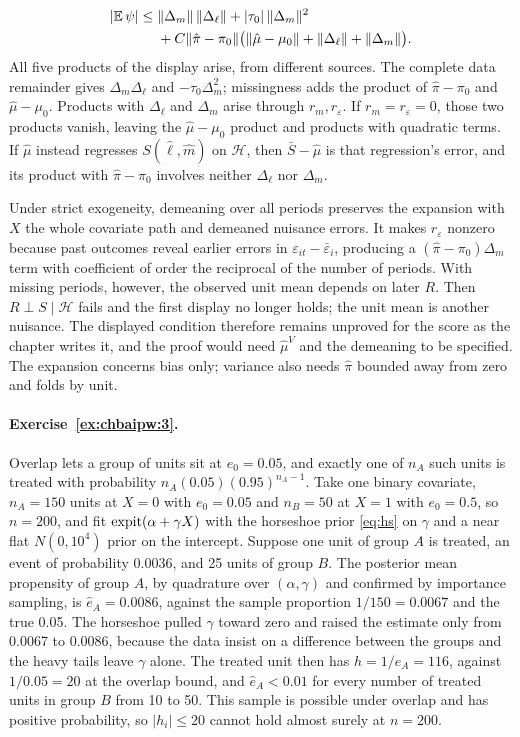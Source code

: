 \[
\begin{split}
|\mathbb{E}\,\psi| \leq{}& \|\Delta_m\|\,\|\Delta_\ell\| + |\tau_0|\,\|\Delta_m\|^2 \\
&+ C\|\hat\pi - \pi_0\|\bigl(\|\hat\mu - \mu_0\| + \|\Delta_\ell\| + \|\Delta_m\|\bigr).
\end{split}
\]
All five products of the display arise, from different sources. The complete data remainder gives $\Delta_m\Delta_\ell$ and $-\tau_0\Delta_m^2$; missingness adds the product of $\hat\pi-\pi_0$ and $\hat\mu-\mu_0$. Products with $\Delta_\ell$ and $\Delta_m$ arise through $r_m,r_\varepsilon$. If $r_m=r_\varepsilon=0$, those two products vanish, leaving the $\hat\mu-\mu_0$ product and products with quadratic terms. If $\hat\mu$ instead regresses $S(\hat\ell,\hat m)$ on $\mathcal H$, then $\bar S-\hat\mu$ is that regression's error, and its product with $\hat\pi-\pi_0$ involves neither $\Delta_\ell$ nor $\Delta_m$.

Under strict exogeneity, demeaning over all periods preserves the expansion with $X$ the whole covariate path and demeaned nuisance errors. It makes $r_\varepsilon$ nonzero because past outcomes reveal earlier errors in $\varepsilon_{it}-\bar\varepsilon_i$, producing a $(\hat\pi-\pi_0)\Delta_m$ term with coefficient of order the reciprocal of the number of periods. With missing periods, however, the observed unit mean depends on later $R$. Then $R\perp S\mid\mathcal H$ fails and the first display no longer holds; the unit mean is another nuisance. The displayed condition therefore remains unproved for the score as the chapter writes it, and the proof would need $\hat\mu^V$ and the demeaning to be specified. The expansion concerns bias only; variance also needs $\hat\pi$ bounded away from zero and folds by unit.

\paragraph{Exercise~\ref{ex:chbaipw:3}.} Overlap lets a group of units sit at $e_0 = 0.05$, and exactly one of $n_A$ such units is treated with probability $n_A(0.05)(0.95)^{n_A - 1}$. Take one binary covariate, $n_A = 150$ units at $X = 0$ with $e_0 = 0.05$ and $n_B = 50$ at $X = 1$ with $e_0 = 0.5$, so $n = 200$, and fit $\operatorname{expit}(\alpha + \gamma X)$ with the horseshoe prior \eqref{eq:hs} on $\gamma$ and a near flat $N(0, 10^4)$ prior on the intercept. Suppose one unit of group $A$ is treated, an event of probability 0.0036, and 25 units of group $B$. The posterior mean propensity of group $A$, by quadrature over $(\alpha, \gamma)$ and confirmed by importance sampling, is $\hat e_A = 0.0086$, against the sample proportion $1/150 = 0.0067$ and the true 0.05. The horseshoe pulled $\gamma$ toward zero and raised the estimate only from 0.0067 to 0.0086, because the data insist on a difference between the groups and the heavy tails leave $\gamma$ alone. The treated unit then has $h = 1/\hat e_A = 116$, against $1/0.05 = 20$ at the overlap bound, and $\hat e_A < 0.01$ for every number of treated units in group $B$ from 10 to 50. This sample is possible under overlap and has positive probability, so $|h_i| \leq 20$ cannot hold almost surely at $n = 200$.

